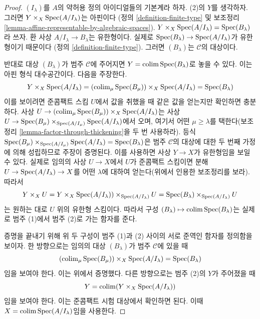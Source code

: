 \begin{proof}
$(I_\lambda)$를 $A$의 약허용 정의 아이디얼들의 기본계라 하자.
(2)의 $Y$를 생각하자. 그러면
$Y \times_X \mathop{\mathrm{Spec}}(A/I_\lambda)$는 아핀이다
(정의 \ref{definition-finite-type} 및 보조정리
\ref{lemma-affine-representable-by-algebraic-spaces}).
$Y \times_X \mathop{\mathrm{Spec}}(A/I_\lambda) = \mathop{\mathrm{Spec}}(B_\lambda)$라 쓰자.
환 사상 $A/I_\lambda \to B_\lambda$는 유한형이다. 실제로
$\mathop{\mathrm{Spec}}(B_\lambda) \to \mathop{\mathrm{Spec}}(A/I_\lambda)$가 유한형이기 때문이다
(정의 \ref{definition-finite-type}). 그러면 $(B_\lambda)$는
$\mathcal{C}$의 대상이다.

\medskip\noindent
반대로 대상 $(B_\lambda)$가 범주 $\mathcal{C}$에 주어지면
$Y = \mathop{\mathrm{colim}}\nolimits \mathop{\mathrm{Spec}}(B_\lambda)$로 놓을 수 있다. 이는 아핀 형식
대수공간이다. 다음을 주장한다.
$$
Y \times_X \mathop{\mathrm{Spec}}(A/I_\lambda) =
\left(\mathop{\mathrm{colim}}\nolimits_\mu \mathop{\mathrm{Spec}}(B_\mu)\right) \times_X \mathop{\mathrm{Spec}}(A/I_\lambda) =
\mathop{\mathrm{Spec}}(B_\lambda)
$$
이를 보이려면 준콤팩트 스킴 $U$에서 값을 취했을 때 같은 값을 얻는지만
확인하면 충분하다. 사상
$U \to \left(\mathop{\mathrm{colim}}\nolimits_\mu \mathop{\mathrm{Spec}}(B_\mu)\right) \times_X
\mathop{\mathrm{Spec}}(A/I_\lambda)$는 사상
$U \to \mathop{\mathrm{Spec}}(B_\mu) \times_{\mathop{\mathrm{Spec}}(A/I_\mu)} \mathop{\mathrm{Spec}}(A/I_\lambda)$에서
오며, 여기서 어떤 $\mu \geq \lambda$를 택한다(보조정리
\ref{lemma-factor-through-thickening}을 두 번 사용하라). 등식
$\mathop{\mathrm{Spec}}(B_\mu) \times_{\mathop{\mathrm{Spec}}(A/I_\mu)} \mathop{\mathrm{Spec}}(A/I_\lambda) =
\mathop{\mathrm{Spec}}(B_\lambda)$은 범주 $\mathcal{C}$의 대상에 대한 두 번째 가정에
의해 성립하므로 주장이 증명된다. 이를 사용하면 사상
$Y \to X$가 유한형임을 보일 수 있다. 실제로 임의의 사상
$U \to X$에서 $U$가 준콤팩트 스킴이면 분해
$U \to \mathop{\mathrm{Spec}}(A/I_\lambda) \to X$를 어떤 $\lambda$에 대하여 얻는다(위에서 인용한 보조정리를
보라). 따라서
$$
Y \times_X U =
Y \times_X \Spec(A/I_\lambda)) \times_{\Spec(A/I_\lambda)} U = %
\Spec(B_\lambda) \times_{\Spec(A/I_\lambda)} U
$$
는 원하는 대로 $U$ 위의 유한형 스킴이다. 따라서 구성
$(B_\lambda) \mapsto \mathop{\mathrm{colim}}\nolimits \mathop{\mathrm{Spec}}(B_\lambda)$는 실제로 범주 (1)에서
범주 (2)로 가는 함자를 준다.

\medskip\noindent
증명을 끝내기 위해 위 두 구성이 범주 (1)과 (2) 사이의 서로 준역인
함자를 정의함을 보이자. 한 방향으로는 임의의 대상 $(B_\lambda)$가
범주 $\mathcal{C}$에 있을 때
$$
\left(\mathop{\mathrm{colim}}\nolimits_\mu \mathop{\mathrm{Spec}}(B_\mu)\right) \times_X \mathop{\mathrm{Spec}}(A/I_\lambda) =
\mathop{\mathrm{Spec}}(B_\lambda)
$$
임을 보여야 한다. 이는 위에서 증명했다. 다른 방향으로는 범주 (2)의
$Y$가 주어졌을 때
$$
Y = \mathop{\mathrm{colim}}\nolimits (Y \times_X \mathop{\mathrm{Spec}}(A/I_\lambda))
$$
임을 보여야 한다. 이는 준콤팩트 시험 대상에서 확인하면 된다.
이때 $X = \mathop{\mathrm{colim}}\nolimits \mathop{\mathrm{Spec}}(A/I_\lambda)$임을 사용한다.
\end{proof}

